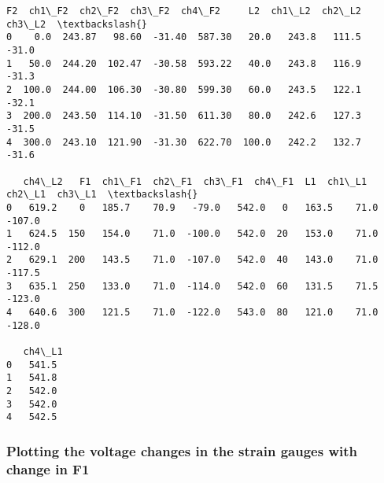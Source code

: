 \documentclass[11pt]{article}
\begin{document}
    \begin{Verbatim}[commandchars=\\\{\}]
      F2  ch1\_F2  ch2\_F2  ch3\_F2  ch4\_F2     L2  ch1\_L2  ch2\_L2  ch3\_L2  \textbackslash{}
0    0.0  243.87   98.60  -31.40  587.30   20.0   243.8   111.5   -31.0
1   50.0  244.20  102.47  -30.58  593.22   40.0   243.8   116.9   -31.3
2  100.0  244.00  106.30  -30.80  599.30   60.0   243.5   122.1   -32.1
3  200.0  243.50  114.10  -31.50  611.30   80.0   242.6   127.3   -31.5
4  300.0  243.10  121.90  -31.30  622.70  100.0   242.2   132.7   -31.6

   ch4\_L2   F1  ch1\_F1  ch2\_F1  ch3\_F1  ch4\_F1  L1  ch1\_L1  ch2\_L1  ch3\_L1  \textbackslash{}
0   619.2    0   185.7    70.9   -79.0   542.0   0   163.5    71.0  -107.0
1   624.5  150   154.0    71.0  -100.0   542.0  20   153.0    71.0  -112.0
2   629.1  200   143.5    71.0  -107.0   542.0  40   143.0    71.0  -117.5
3   635.1  250   133.0    71.0  -114.0   542.0  60   131.5    71.5  -123.0
4   640.6  300   121.5    71.0  -122.0   543.0  80   121.0    71.0  -128.0

   ch4\_L1
0   541.5
1   541.8
2   542.0
3   542.0
4   542.5
    \end{Verbatim}

    \hypertarget{plotting-the-voltage-changes-in-the-strain-gauges-with-change-in-f1}{%
\subsubsection{Plotting the voltage changes in the strain gauges with
change in
F1}\label{plotting-the-voltage-changes-in-the-strain-gauges-with-change-in-f1}}
\end{document}
